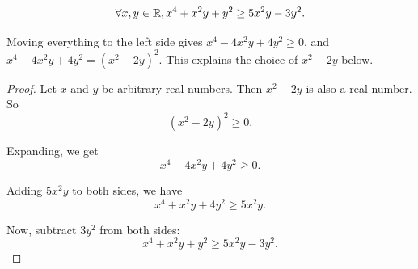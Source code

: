 \begin{proposition}
    \begin{equation*}
        \forall x, y \in \mathbb{R}, x^4 + x^2y + y^2 \geq 5x^2y - 3y^2.
    \end{equation*}
\end{proposition}
\begin{remark}
    Moving everything to the left side gives $x^4 - 4x^2y + 4y^2 \geq 0$, and
    $x^4 - 4x^2y + 4y^2 = (x^2 - 2y)^2$. This explains the choice of $x^2 - 2y$ below.
\end{remark}
\begin{proof}
    Let $x$ and $y$ be arbitrary real numbers. Then $x^2 - 2y$ is also a real number. So
    \begin{equation*}
        (x^2 - 2y)^2 \geq 0.
    \end{equation*}

    Expanding, we get
    \begin{equation*}
        x^4 - 4x^2y + 4y^2 \geq 0.
    \end{equation*}

    Adding $5x^2y$ to both sides, we have
    \begin{equation*}
        x^4 + x^2y + 4y^2 \geq 5x^2y.
    \end{equation*}

    Now, subtract $3y^2$ from both sides:
    \begin{equation*}
        x^4 + x^2y + y^2 \geq 5x^2y - 3y^2.
    \end{equation*}
\end{proof}


